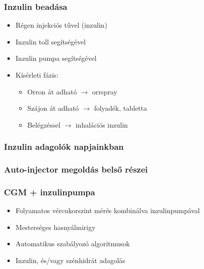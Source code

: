 \subsubsection{Inzulin beadása}
\begin{itemize}
    \item Régen injekciós tűvel (inzulin)
    \item Inzulin toll segítségével
    \item Inzulin pumpa segítségével
    \item Kísérleti fázis:
    \begin{itemize}
        \item Orron át adható $\rightarrow$ orrspray
        \item Szájon át adható $\rightarrow$ folyadék, tabletta
        \item Belégzéssel $\rightarrow$ inhalációs inzulin
    \end{itemize}
\end{itemize}

\subsubsection{Inzulin adagolók napjainkban}

\subsubsection{Auto-injector megoldás belső részei}

\subsubsection{CGM + inzulinpumpa}
\begin{itemize}
    \item Folyamatos vércukorszint mérés kombinálva inzulinpumpával
    \item Mesterséges hasnyálmirigy
    \item Automatikus szabályozó algoritmusok
    \item Inzulin, és/vagy szénhidrát adagolás
\end{itemize}

\clearpage
